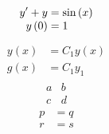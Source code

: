 \documentclass[12pt]{article}
\begin{document}
\[
\begin{array}{>{\displaystyle}r @{\;} >{\displaystyle}l}
y^{\prime}+y&=\sin \left(x \right)\\
y \left(0\right)&=1\\
\end{array}
\]
\begin{gather*}
\begin{aligned}
y(x) &= C_1 y(x)\\ g(x) &= C_1 y_1
\end{aligned}
\end{gather*}
{\renewcommand\arraystretch{2}
\[\begin{array}{cc}a&b\\c&d\end{array}\]}
{\setlength\jot{6pt}
\begin{gather*}
\begin{aligned}
p &= q\\ r &= s
\end{aligned}
\end{gather*}}
\end{document}
